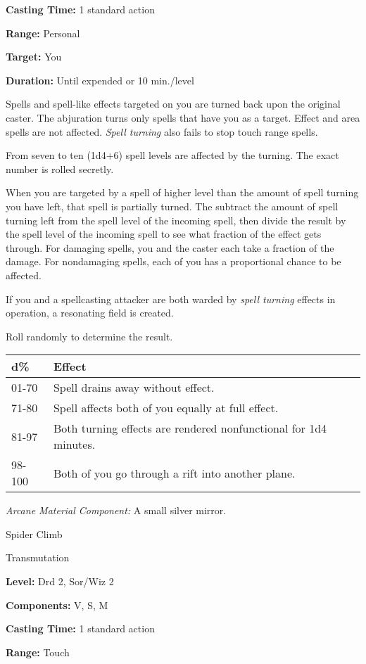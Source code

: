\documentclass{article}
\begin{document}
\textbf{Casting Time:} 1 standard action

\textbf{Range:} Personal

\textbf{Target:} You

\textbf{Duration:} Until expended or 10 min./level

Spells and spell-like effects targeted on you are turned back upon the original 
caster. The abjuration turns only spells that have you as a target. Effect and 
area spells are not affected. \textit{Spell turning }also fails to stop touch range 
spells. 

From seven to ten (1d4+6) spell levels are affected by the turning. The exact number 
is rolled secretly.

When you are targeted by a spell of higher level than the amount of spell turning 
you have left, that spell is partially turned. The subtract the amount of spell 
turning left from the spell level of the incoming spell, then divide the result 
by the spell level of the incoming spell to see what fraction of the effect gets 
through. For damaging spells, you and the caster each take a fraction of the damage. 
For nondamaging spells, each of you has a proportional chance to be affected.

If you and a spellcasting attacker are both warded by \textit{spell turning }effects 
in operation, a resonating field is created.

Roll randomly to determine the result.

\begin{tabular}{|>{\raggedright}p{28pt}|>{\raggedright}p{257pt}|}
\hline
d\textbf{\%} & E\textbf{ffect}\tabularnewline
\hline
01-70 & Spell drains away without effect.\tabularnewline
\hline
71-80 & Spell affects both of you equally at full effect.\tabularnewline
\hline
81-97 & Both turning effects are rendered nonfunctional for 1d4 minutes.\tabularnewline
\hline
98-100 & Both of you go through a rift into another plane.\tabularnewline
\hline
\end{tabular}

\textit{Arcane Material Component: }A small silver mirror.

\vspace{12pt}
Spider Climb

Transmutation

\textbf{Level:} Drd 2, Sor/Wiz 2

\textbf{Components:} V, S, M

\textbf{Casting Time:} 1 standard action

\textbf{Range:} Touch
\end{document}
